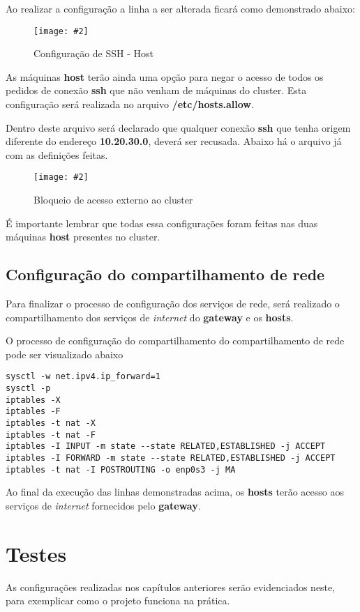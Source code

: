 \documentclass[
	12pt,				%
	openany,			%
	a4paper,			%
	chapter=TITLE,		%
	section=TITLE,		%
	english,
	brazil				%
]{abntex2}
\newcommand{\includeImage}[3] {

\begin{figure}[H]
 	 \centering
  		\texttt{[image: \#2]}
  	\caption{#3}
\end{figure}

}
\begin{document}
Ao realizar a configuração a linha a ser alterada ficará como demonstrado abaixo:
\includeImage{0.5}{imgs/4_configuracao_servicos_rede/1_host_1.png}{Configuração de SSH - Host}

As máquinas \textbf{host} terão ainda uma opção para negar o acesso de todos os pedidos de conexão \textbf{ssh} que não venham de máquinas do cluster. Esta configuração será realizada no arquivo \textbf{/etc/hosts.allow}.

Dentro deste arquivo será declarado que qualquer conexão \textbf{ssh} que tenha origem diferente do endereço \textbf{10.20.30.0}, deverá ser recusada. Abaixo há o arquivo já com as definições feitas.

\includeImage{0.5}{imgs/4_configuracao_servicos_rede/1_host_2.png}{Bloqueio de acesso externo ao cluster}


É importante lembrar que todas essa configurações foram feitas nas duas máquinas \textbf{host} presentes no cluster.


\subsection{Configuração do compartilhamento de rede}

Para finalizar o processo de configuração dos serviços de rede, será realizado o compartilhamento dos serviços de \textit{internet} do \textbf{gateway} e os \textbf{hosts}.

O processo de configuração do compartilhamento do compartilhamento de rede pode ser visualizado abaixo

\begin{lstlisting}
sysctl -w net.ipv4.ip_forward=1
sysctl -p 
iptables -X
iptables -F
iptables -t nat -X
iptables -t nat -F 
iptables -I INPUT -m state --state RELATED,ESTABLISHED -j ACCEPT
iptables -I FORWARD -m state --state RELATED,ESTABLISHED -j ACCEPT 
iptables -t nat -I POSTROUTING -o enp0s3 -j MA
\end{lstlisting} 

Ao final da execução das linhas demonstradas acima, os \textbf{hosts} terão acesso aos serviços de \textit{internet} fornecidos pelo \textbf{gateway}.
 
\section{Testes}

As configurações realizadas nos capítulos anteriores serão evidenciados neste, para exemplicar como o projeto funciona na prática.
\end{document}

